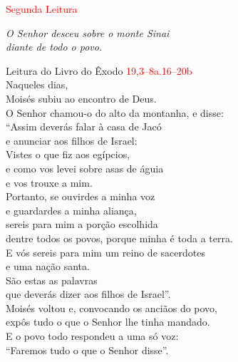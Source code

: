 \documentclass{book}
\begin{document}
\begin{flushleft}
\end{flushleft}

\begin{center}

    \textcolor{red}{Segunda Leitura}

\end{center}

\begin{flushright}
    \textit{O Senhor desceu sobre o monte Sinai \\ diante de todo o povo.}
\end{flushright}

\begin{flushleft}

    \vspace{.2cm}
    Leitura do Livro do Êxodo
    \hspace{\fill}
    \textcolor{red}{19,3--8a.16--20b}
    \vspace{.2cm} \\
    Naqueles dias, \\
    Moisés subiu ao encontro de Deus. \\
    O Senhor chamou-o do alto da montanha, e disse: \\
    ``Assim deverás falar à casa de Jacó \\
    e anunciar aos filhos de Israel: \\
    Vistes o que fiz aos egípcios, \\
    e como vos levei sobre asas de águia \\
    e vos trouxe a mim. \\
    Portanto, se ouvirdes a minha voz \\
    e guardardes a minha aliança, \\
    sereis para mim a porção escolhida \\
    dentre todos os povos, porque minha é toda a terra. \\
    E vós sereis para mim um reino de sacerdotes \\
    e uma nação santa. \\
    São estas as palavras \\
    que deverás dizer aos filhos de Israel''. \\
    Moisés voltou e, convocando os anciãos do povo, \\
    expôs tudo o que o Senhor lhe tinha mandado. \\
    E o povo todo respondeu a uma só voz: \\
    ``Faremos tudo o que o Senhor disse''. \\

\end{flushleft}
\end{document}
